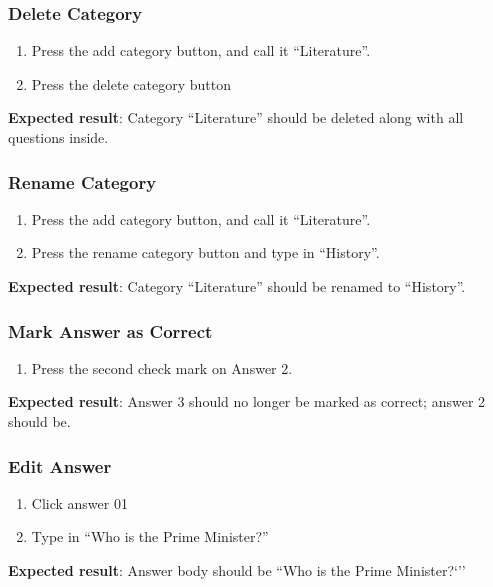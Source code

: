 \subsubsection{Delete Category}
\begin{enumerate}[leftmargin=*]
\item Press the add category button, and call it ``Literature''.
\item Press the delete category button
\end{enumerate}

\textbf{Expected result}: Category ``Literature'' should be deleted along with all questions inside.

\subsubsection{Rename Category}
\begin{enumerate}[leftmargin=*]
\item Press the add category button, and call it ``Literature''.
\item Press the rename category button and type in ``History''.
\end{enumerate}
\textbf{Expected result}: Category ``Literature'' should be renamed to ``History''.

\subsubsection{Mark Answer as Correct}
\begin{enumerate}[leftmargin=*]
\item Press the second check mark on Answer 2.
\end{enumerate}
\textbf{Expected result}: Answer 3 should no longer be marked as correct; answer 2 should be.

\subsubsection{Edit Answer}
\begin{enumerate}[leftmargin=*]
\item Click answer 01
\item Type in ``Who is the Prime Minister?''
\end{enumerate}
\textbf{Expected result}: Answer body should be ``Who is the Prime Minister?`''

